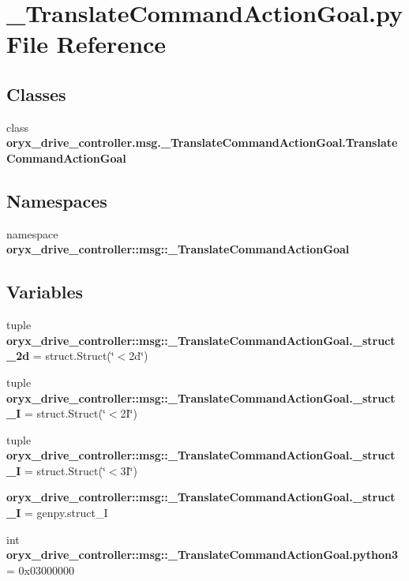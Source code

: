 \section{\-\_\-\-Translate\-Command\-Action\-Goal.\-py \-File \-Reference}
\label{__TranslateCommandActionGoal_8py}
\subsection*{\-Classes}
\begin{DoxyCompactItemize}
\item 
class {\bf oryx\-\_\-drive\-\_\-controller.\-msg.\-\_\-\-Translate\-Command\-Action\-Goal.\-Translate\-Command\-Action\-Goal}
\end{DoxyCompactItemize}
\subsection*{\-Namespaces}
\begin{DoxyCompactItemize}
\item 
namespace {\bf oryx\-\_\-drive\-\_\-controller\-::msg\-::\-\_\-\-Translate\-Command\-Action\-Goal}
\end{DoxyCompactItemize}
\subsection*{\-Variables}
\begin{DoxyCompactItemize}
\item 
tuple {\bf oryx\-\_\-drive\-\_\-controller\-::msg\-::\-\_\-\-Translate\-Command\-Action\-Goal.\-\_\-struct\-\_\-2d} = struct.\-Struct(\char`\"{}$<$2d\char`\"{})
\item 
tuple {\bf oryx\-\_\-drive\-\_\-controller\-::msg\-::\-\_\-\-Translate\-Command\-Action\-Goal.\-\_\-struct\-\_\-I} = struct.\-Struct(\char`\"{}$<$2\-I\char`\"{})
\item 
tuple {\bf oryx\-\_\-drive\-\_\-controller\-::msg\-::\-\_\-\-Translate\-Command\-Action\-Goal.\-\_\-struct\-\_\-I} = struct.\-Struct(\char`\"{}$<$3\-I\char`\"{})
\item 
{\bf oryx\-\_\-drive\-\_\-controller\-::msg\-::\-\_\-\-Translate\-Command\-Action\-Goal.\-\_\-struct\-\_\-\-I} = genpy.\-struct\-\_\-\-I
\item 
int {\bf oryx\-\_\-drive\-\_\-controller\-::msg\-::\-\_\-\-Translate\-Command\-Action\-Goal.\-python3} = 0x03000000
\end{DoxyCompactItemize}
